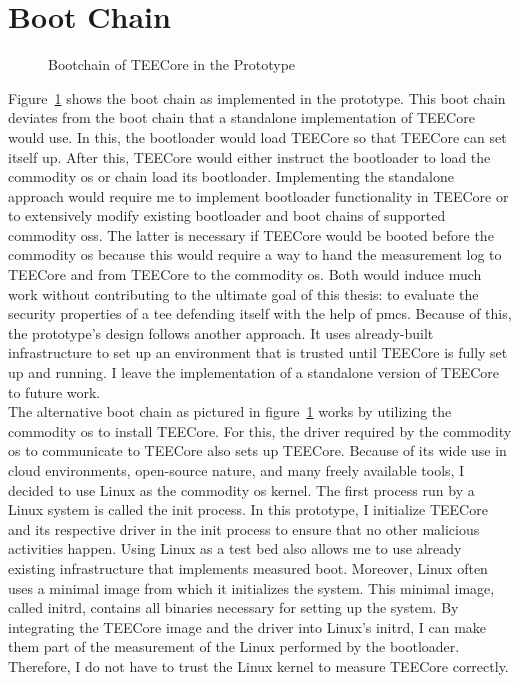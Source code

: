 \section{Boot Chain}
\label{sec:30:tee_boot_chain}
\begin{figure}
  \begin{center}
    
    \caption{Bootchain of TEECore in the Prototype}
    \label{fig:30:tee_bootchain}
  \end{center}
\end{figure}
Figure~\ref{fig:30:tee_bootchain} shows the boot chain as implemented in the
prototype. This boot chain deviates from the boot chain that a standalone
implementation of TEECore would use. In this, the bootloader would load TEECore
so that TEECore can set itself up. After this, TEECore would either instruct the
bootloader to load the commodity \gls{os} or chain load its bootloader.
Implementing the standalone approach would require me to implement bootloader
functionality in TEECore or to extensively modify existing bootloader and boot
chains of supported commodity \glspl{os}. The latter is necessary if TEECore
would be booted before the commodity \gls{os} because this would require a way
to hand the measurement log to TEECore and from TEECore to the commodity
\gls{os}. Both would induce much work without contributing to the ultimate goal
of this thesis: to evaluate the security properties of a \gls{tee} defending
itself with the help of \glspl{pmc}. Because of this, the prototype's design
follows another approach. It uses already-built infrastructure to set up an
environment that is trusted until TEECore is fully set up and running. I leave
the implementation of a standalone version of TEECore to future work.\\

The alternative boot chain as pictured in figure~\ref{fig:30:tee_bootchain}
works by utilizing the commodity \gls{os} to install TEECore. For this, the
driver required by the commodity \gls{os} to communicate to TEECore also sets up
TEECore. Because of its wide use in cloud environments, open-source nature, and
many freely available tools, I decided to use Linux as the commodity \gls{os}
kernel. The first process run by a Linux system is called the init process. In
this prototype, I initialize TEECore and its respective driver in the init
process to ensure that no other malicious activities happen. Using Linux as a
test bed also allows me to use already existing infrastructure that implements
measured boot. Moreover, Linux often uses a minimal image from which it
initializes the system. This minimal image, called initrd, contains all binaries
necessary for setting up the system. By integrating the TEECore image and the
driver into Linux's initrd, I can make them part of the measurement of the Linux
performed by the bootloader. Therefore, I do not have to trust the Linux kernel
to measure TEECore correctly. \\

